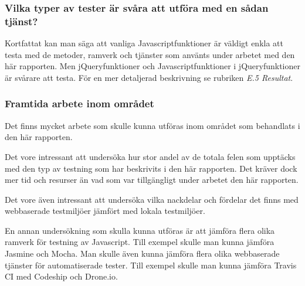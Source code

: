 \subsubsection{Vilka typer av tester är svåra att utföra 
med en sådan tjänst?}
Kortfattat kan man säga att vanliga Javascriptfunktioner är
väldigt enkla att testa med de metoder, ramverk och tjänster som
använts under arbetet med den här rapporten. Men jQueryfunktioner och
Javascriptfunktioner i jQueryfunktioner är svårare att
testa. För en mer detaljerad beskrivning se rubriken \emph{E.5 Resultat}.

\subsubsection{Framtida arbete inom området}
Det finns mycket arbete som skulle kunna utföras inom området som behandlats
i den här rapporten.

Det vore intressant att undersöka hur stor andel av de totala felen
som upptäcks med den typ av testning som har beskrivits i den här rapporten.
Det kräver dock mer tid och resurser än vad som var tillgängligt under
arbetet den här rapporten.

Det vore även intressant att undersöka vilka nackdelar och fördelar det
finns med webbaserade testmiljöer jämfört med lokala
testmiljöer.

En annan undersökning som skulla kunna utföras är att jämföra
flera olika ramverk för testning av Javascript. Till exempel skulle
man kunna jämföra Jasmine och Mocha. Man skulle även kunna jämföra
flera olika webbaserade tjänster för automatiserade tester. Till
exempel skulle man kunna jämföra Travis CI med Codeship och Drone.io.




